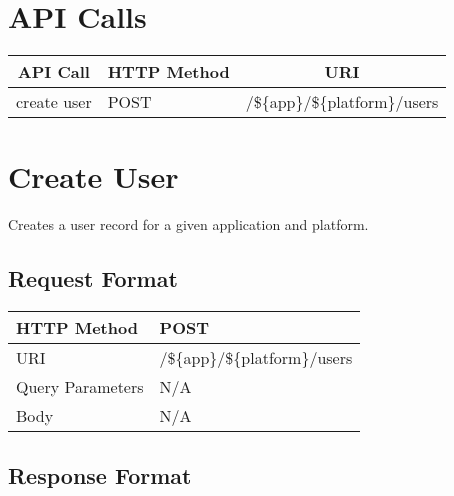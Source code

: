 
\section{API Calls}
\begin{center}
\begin{tabular}{|l||l||l|}
\hline

\multicolumn{1}{|c||}{\textbf{API Call}} &
\multicolumn{1}{c||}{\textbf{HTTP Method}} &
\multicolumn{1}{c|}{\textbf{URI}} \\

\hline
\hline
create user   & POST & /\$\{app\}/\$\{platform\}/users                \\
\hline
\end{tabular}
\end{center}

\section{Create User}

Creates a user record for a given application and platform.

\subsection{Request Format}

\begin{center}
\begin{tabular}{|l||l|}
\hline
HTTP Method & POST           \\
\hline
URI         & /\$\{app\}/\$\{platform\}/users \\
\hline
Query Parameters & N/A           \\
\hline
Body        & N/A           \\
\hline
\end{tabular}
\end{center}


\subsection{Response Format}


